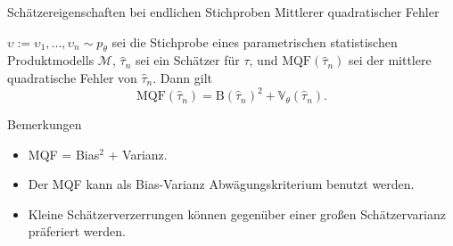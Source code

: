 \documentclass[
  8pt,
  ignorenonframetext,
]{beamer}
\providecommand{\tightlist}{%
  \setlength{\itemsep}{0pt}\setlength{\parskip}{0pt}}
\newcommand{\ups} {\upsilon}
\begin{document}
\begin{frame}{\small Schätzereigenschaften bei endlichen Stichproben
\textbar{} Mittlerer quadratischer Fehler}
\protect\hypertarget{schuxe4tzereigenschaften-bei-endlichen-stichproben-mittlerer-quadratischer-fehler-1}{}
\small
\begin{theorem}
\justifying
\normalfont
$\ups := \ups_1,...,\ups_n \sim  p_\theta$ sei die Stichprobe eines parametrischen statistischen
Produktmodells $\mathcal{M}$, $\hat{\tau}_n$ sei ein Schätzer für $\tau$, und
$\mbox{MQF}(\hat{\tau}_n)$ sei der mittlere quadratische Fehler von $\hat{\tau}_n$.
Dann gilt
\begin{equation}
\mbox{MQF}(\hat{\tau}_n) = \mbox{B}(\hat{\tau}_n)^2 + \mathbb{V}_\theta(\hat{\tau}_n).
\end{equation}
\end{theorem}

\footnotesize

Bemerkungen

\begin{itemize}
\tightlist
\item
  MQF = Bias\(^2\) + Varianz.
\item
  Der MQF kann als Bias-Varianz Abwägungskriterium benutzt werden.
\item
  Kleine Schätzerverzerrungen können gegenüber einer großen
  Schätzervarianz präferiert werden.
\end{itemize}
\end{frame}
\end{document}
